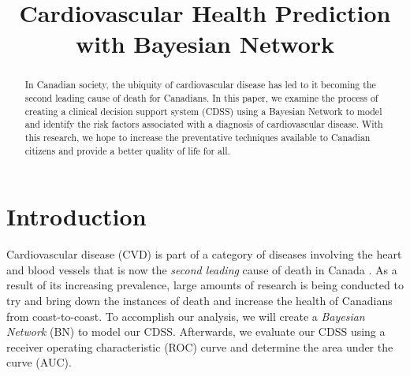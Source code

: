 \documentclass[conference]{IEEEtran}
\begin{document}
\title{Cardiovascular Health Prediction with Bayesian Network}


\author{
}

\maketitle

\begin{abstract}
In Canadian society, the ubiquity of cardiovascular disease has led to it becoming the second leading cause of death for Canadians. In this paper, we examine the process of creating a clinical decision support system (CDSS) using a Bayesian Network to model and identify the risk factors associated with a diagnosis of cardiovascular disease. With this research, we hope to increase the preventative techniques available to Canadian citizens and provide a better quality of life for all.
\end{abstract}

\IEEEpeerreviewmaketitle

\section{Introduction}
Cardiovascular disease (CVD) is part of a category of diseases involving the heart and blood vessels that is now the \textit{second leading} cause of death in Canada \cite{StatsCan}. As a result of its increasing prevalence, large amounts of research is being conducted to try and bring down the instances of death and increase the health of Canadians from coast-to-coast. To accomplish our analysis, we will create a \textit{Bayesian Network} (BN) to model our CDSS. Afterwards, we evaluate our CDSS using a receiver operating characteristic (ROC) curve and determine the area under the curve (AUC).  
\end{document}
